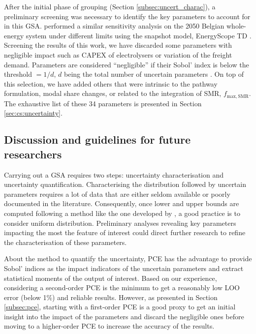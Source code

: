 After the initial phase of grouping (Section \ref{subsec:uncert_charac}), a preliminary screening was necessary to identify the key parameters to account for in this \gls{GSA}. \citet{rixhon2021role} performed a similar sensitivity analysis on the 2050 Belgian whole-energy system under different  limits using the snapshot model, EnergyScope TD \cite{limpens2019energyscope}. Screening the results of this work, we have discarded some parameters with negligible impact such as CAPEX of electrolysers or variation of the freight demand. Parameters are considered ``negligible'' if their Sobol' index is below the threshold $=1/d$, $d$ being the total number of uncertain parameters \cite{Turati2017}. On top of this selection, we have added others that were intrinsic to the pathway formulation, \eg modal share changes, or related to the integration of \gls{SMR}, $f_{\mathrm{max,SMR}}$. The exhaustive list of these 34 parameters is presented in Section \ref{sec:cs:uncertainty}.

\subsection{Discussion and guidelines for future researchers}
\label{subsec:meth:UQ:discussion}
Carrying out a \acrfull{GSA} requires two steps: uncertainty characterisation and uncertainty quantification. Characterising the distribution followed by uncertain parameters requires a lot of data that are either seldom available or poorly documented in the literature. Consequently, once lower and upper bounds are computed following a method like the one developed by \citet{Moret2017}, a good practice is to consider uniform distribution. Preliminary analyses revealing key parameters impacting the most the feature of interest could direct further research to refine the characterisation of these parameters.

About the method to quantify the uncertainty, \gls{PCE} has the advantage to provide Sobol' indices as the impact indicators of the uncertain parameters and extract statistical moments of the output of interest. Based on our experience, considering a second-order \gls{PCE} is the minimum to get a reasonably low \gls{LOO} error (below 1\%) and reliable results. However, as presented in Section \ref{subsec:pce}, starting with a first-order \gls{PCE} is a good proxy to get an initial insight into the impact of the parameters and discard the negligible ones before moving to a higher-order \gls{PCE} to increase the accuracy of the results.

